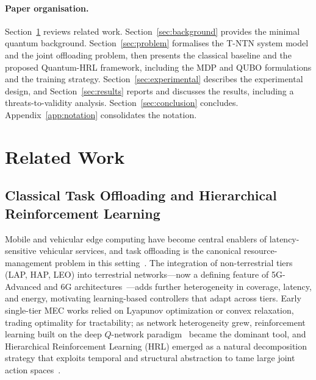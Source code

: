 \documentclass[11pt,a4paper]{article}
\theoremstyle{definition}
\begin{document}
\paragraph{Paper organisation.}
Section~\ref{sec:related} reviews related work. Section~\ref{sec:background} provides the minimal quantum background. Section~\ref{sec:problem} formalises the T-NTN system model and the joint offloading problem, then presents the classical baseline and the proposed Quantum-HRL framework, including the MDP and QUBO formulations and the training strategy. Section~\ref{sec:experimental} describes the experimental design, and Section~\ref{sec:results} reports and discusses the results, including a threats-to-validity analysis. Section~\ref{sec:conclusion} concludes. Appendix~\ref{app:notation} consolidates the notation.

\section{Related Work}
\label{sec:related}

\subsection{Classical Task Offloading and Hierarchical Reinforcement Learning}
\label{subsec:rw_hrl}

Mobile and vehicular edge computing have become central enablers of latency-sensitive vehicular services, and task offloading is the canonical resource-management problem in this setting~\cite{mao2017mec,liu2021vec}. The integration of non-terrestrial tiers (LAP, HAP, LEO) into terrestrial networks---now a defining feature of 5G-Advanced and 6G architectures~\cite{rinaldi2020ntn,giordani2021ntn,kodheli2021satellite}---adds further heterogeneity in coverage, latency, and energy, motivating learning-based controllers that adapt across tiers. Early single-tier MEC works relied on Lyapunov optimization or convex relaxation, trading optimality for tractability; as network heterogeneity grew, reinforcement learning built on the deep $Q$-network paradigm~\cite{mnih2015dqn,sutton2018rl} became the dominant tool, and Hierarchical Reinforcement Learning (HRL) emerged as a natural decomposition strategy that exploits temporal and structural abstraction to tame large joint action spaces~\cite{barto2003hrl}.
\end{document}
